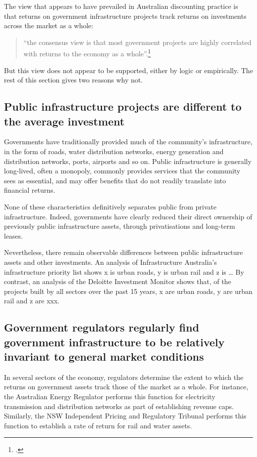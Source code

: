 The view that appears to have prevailed in Australian discounting practice is that returns on government infrastructure projects track returns on investments across the market as a whole:

\begin{quote}
 “the consensus view is that most government projects are highly correlated with returns to the economy as a whole”.\footcite[][60]{Harrison-Valuing-the-Future} 
\end{quote}

But this view does not appear to be supported, either by logic or empirically. The rest of this section gives two reasons why not.

\subsection{Public infrastructure projects are different to the average investment}

Governments have traditionally provided much of the community’s infrastructure, in the form of roads, water distribution networks, energy generation and distribution networks, ports, airports and so on. Public infrastructure is generally long-lived, often a monopoly, commonly provides services that the community sees as essential, and may offer benefits that do not readily translate into financial returns.

None of these characteristics definitively separates public from private infrastructure. Indeed, governments have clearly reduced their direct ownership of previously public infrastructure assets, through privatisations and long-term leases.

Nevertheless, there remain observable differences between public infrastructure assets and other investments. An analysis of Infrastructure Australia’s infrastructure priority list shows x is urban roads, y is urban rail and z is … By contrast, an analysis of the Deloitte Investment Monitor shows that, of the projects built by all sectors over the past 15 years, x are urban roads, y are urban rail and z are xxx. 

\subsection{Government regulators regularly find government infrastructure to be relatively invariant to general market conditions}

In several sectors of the economy, regulators determine the extent to which the returns on government assets track those of the market as a whole. For instance, the Australian Energy Regulator performs this function for electricity transmission and distribution networks as part of establishing revenue caps. Similarly, the NSW Independent Pricing and Regulatory Tribunal performs this function to establish a rate of return for rail and water assets.

